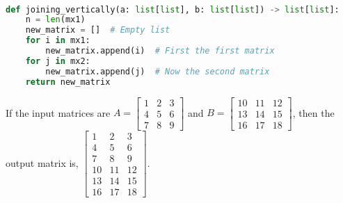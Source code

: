 \begin{explanation}
	\phantom \\
	\begin{lstlisting}[language=Python, numbers=none]
def joining_vertically(a: list[list], b: list[list]) -> list[list]:
    n = len(mx1)
    new_matrix = []  # Empty list
    for i in mx1:
        new_matrix.append(i)  # First the first matrix
    for j in mx2:
        new_matrix.append(j)  # Now the second matrix
    return new_matrix \end{lstlisting}
	If the input matrices are $A=\begin{bmatrix}
			1 & 2 & 3 \\
			4 & 5 & 6 \\
			7 & 8 & 9
		\end{bmatrix}$ and $B=\begin{bmatrix}
			10 & 11 & 12 \\
			13 & 14 & 15 \\
			16 & 17 & 18
		\end{bmatrix}$, then the output matrix is, $\begin{bmatrix}
			1  & 2  & 3  \\
			4  & 5  & 6  \\
			7  & 8  & 9  \\
			10 & 11 & 12 \\
			13 & 14 & 15 \\
			16 & 17 & 18
		\end{bmatrix}$.
\end{explanation}
